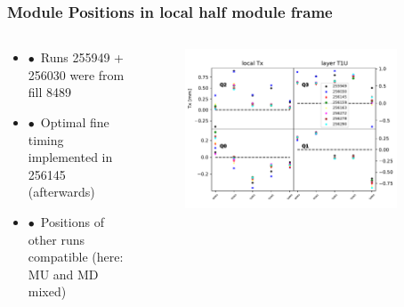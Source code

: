 \documentclass[aspectratio=1610, 12pt]{beamer}
\begin{document}
\begin{frame}\frametitle{Module Positions in local half module frame}
  \begin{columns}
    \begin{column}[c]{0.35\textwidth}
      \begin{itemize}
        \setlength\itemsep{0em}
        \item $\bullet$\, Runs 255949 + 256030 were from fill 8489
        \item $\bullet$\, Optimal fine timing implemented in 256145 (afterwards)
        \item $\bullet$\, Positions of other runs compatible (here: MU and MD mixed)
      \end{itemize}
    \end{column}
    \begin{column}[c]{0.65\textwidth}
      \begin{figure}
        \includegraphics[width=0.9\textwidth]{plots/plain_data/raw_data_T1U_Tx.pdf}
      \end{figure}
    \end{column}
  \end{columns}
\end{frame}
\end{document}
